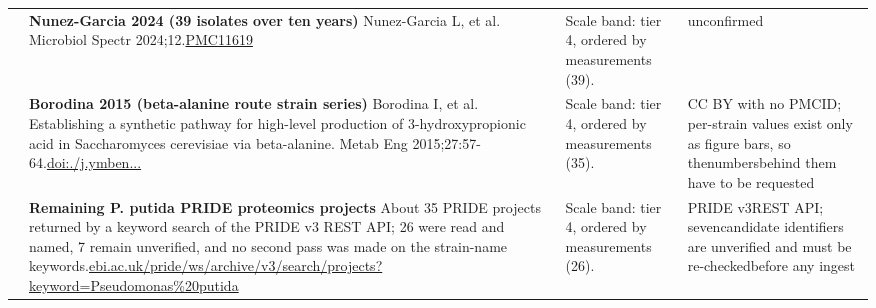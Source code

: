 \begin{landscape}
\begin{longtable}{@{}r@{\hspace{4pt}} L{78mm} L{72mm} L{76mm}@{}}
 & \textbf{Nunez-Garcia 2024 (39 isolates over ten years)} \newline Nunez-Garcia L, et al. Microbiol Spectr 2024;12.\newline \href{https://pmc.ncbi.nlm.nih.gov/articles/PMC11619361/}{PMC11619} & Scale band: tier 4, ordered by measurements (39). & unconfir\allowbreak med \\
 & \textbf{Borodina 2015 (beta-alanine route strain series)} \newline Borodina I, et al. Establishing a synthetic pathway for high-level production of 3-hydroxypropionic acid in Saccharomyces cerevisiae via beta-alanine. Metab Eng 2015;27:57-64.\newline \href{https://doi.org/10.1016/j.ymben.2014.10.003}{doi:./\allowbreak j.\allowbreak ymben...} & Scale band: tier 4, ordered by measurements (35). & CC BY wi\allowbreak th no PM\allowbreak CID; per\allowbreak -\allowbreak strain \allowbreak values e\allowbreak xist onl\allowbreak y as fig\allowbreak ure bars\allowbreak , so the\allowbreak  numbers\allowbreak  behind \allowbreak them hav\allowbreak e to be \allowbreak requeste\allowbreak d \\
 & \textbf{Remaining P. putida PRIDE proteomics projects} \newline About 35 PRIDE projects returned by a keyword search of the PRIDE v3 REST API; 26 were read and named, 7 remain unverified, and no second pass was made on the strain-name keywords.\newline \href{https://www.ebi.ac.uk/pride/ws/archive/v3/search/projects?keyword=Pseudomonas\%20putida}{ebi.\allowbreak ac.\allowbreak uk/\allowbreak pride/\allowbreak ws/\allowbreak archive\allowbreak /\allowbreak v3/\allowbreak search/\allowbreak project\allowbreak s?\allowbreak keyword\allowbreak =\allowbreak Pseudom\allowbreak onas\%\allowbreak 20putid\allowbreak a} & Scale band: tier 4, ordered by measurements (26). & PRIDE v3\allowbreak  REST AP\allowbreak I; seven\allowbreak  candida\allowbreak te ident\allowbreak ifiers a\allowbreak re unver\allowbreak ified an\allowbreak d must b\allowbreak e re-\allowbreak checked\allowbreak  before \allowbreak any inge\allowbreak st \\

\end{longtable}
\end{landscape}
